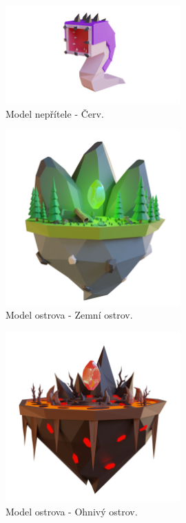 \begin{figure}[h]
    \centering
    \includegraphics[width=0.6\textwidth]{img/nepritel-cerv.png}
    \caption{Model nepřítele - Červ.}
    \label{fig:nepritel-cerv}
\end{figure}

\begin{figure}[h]
    \centering
    \includegraphics[width=0.6\textwidth]{img/NatureIsland.png}
    \caption{Model ostrova - Zemní ostrov.}
    \label{fig:nature-island}
\end{figure}

\begin{figure}[h]
    \centering
    \includegraphics[width=0.6\textwidth]{img/FireIsland.png}
    \caption{Model ostrova - Ohnivý ostrov.}
    \label{fig:fire-island}
\end{figure}

